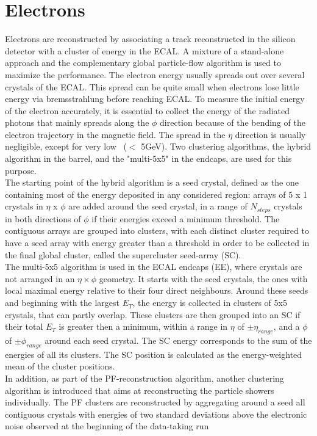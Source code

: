 \section{Electrons}
Electrons \cite{electrons} are reconstructed by associating a track reconstructed in the silicon detector with a cluster of energy in the ECAL. A mixture of a stand-alone approach \cite{electrons_2} and the complementary global particle-flow algorithm is used to maximize the performance. The electron energy usually spreads out over several crystals of the ECAL. This spread can be quite small when electrons lose little energy via bremsstrahlung before reaching ECAL. To measure the initial energy of the electron accurately, it is essential to collect the energy of the radiated photons that mainly spreads along the $\phi$ direction because of the bending of the electron trajectory in the magnetic field. The spread in the $\eta$ direction is usually negligible, except for very low \pt~(\pt $<$ 5GeV). Two clustering algorithms, the hybrid algorithm in the barrel, and the "multi-5x5" in the endcaps, are used for this purpose. \\
The starting point of the hybrid algorithm is a seed crystal, defined as the one containing most of the energy deposited in any considered region: arrays of 5 x 1 crystals in $\eta$ x $\phi$ are added around the seed crystal, in a range of $N_{steps}$ crystals in both directions of $\phi$ if their energies exceed a minimum threshold. The contiguous arrays are grouped into clusters, with each distinct cluster required to have a seed array with energy greater than a threshold in order to be collected in the final global cluster, called the supercluster seed-array (SC). \\
The multi-5x5 algorithm is used in the ECAL endcaps (EE), where crystals are not arranged in an $\eta \times \phi$ geometry. It starts with the seed crystals, the ones with local maximal energy relative to their four direct neighbours. Around these seeds and beginning with the largest $E_T$, the energy is collected in clusters of 5x5 crystals, that can partly overlap. These clusters are then grouped into an SC if their total $E_T$ is greater then a minimum, within a range in $\eta$ of $\pm \eta_{range}$, and a $\phi$ of $\pm \phi_{range}$ around each seed crystal. The SC energy corresponds to the sum of the energies of all its clusters. The SC position is calculated as the energy-weighted mean of the cluster positions. \\
In addition, as part of the PF-reconstruction algorithm, another clustering algorithm is introduced that aims at reconstructing the particle showers individually. The PF clusters are reconstructed by aggregating around a seed all contiguous crystals with energies of two standard deviations above the electronic noise observed at the beginning of the data-taking run \\
